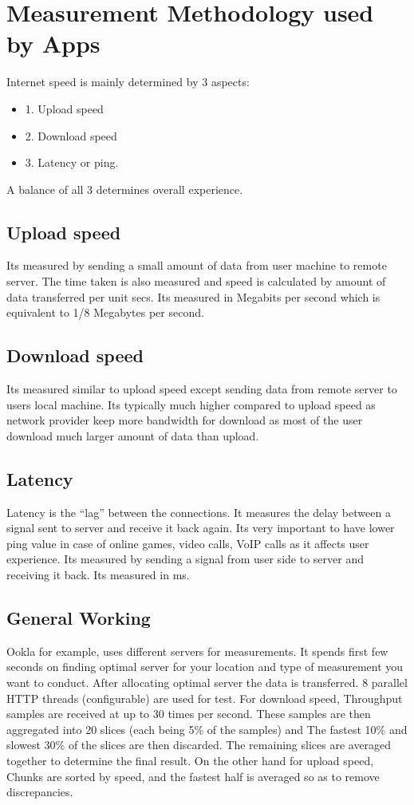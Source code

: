 \documentclass{article}
\begin{document}
\section{Measurement Methodology used by Apps}
Internet speed is mainly determined by  3 aspects:
\begin{itemize}
    \item 1. Upload speed 
\item 2. Download speed
\item 3. Latency or ping.
\end{itemize}


A balance of all 3 determines overall experience.
\subsection{Upload speed}
Its measured by sending a small amount of data from user machine to remote server. The time taken is also measured and speed is calculated by amount of data transferred per unit secs. Its measured in Megabits per second which is equivalent to 1/8 Megabytes per second.
\subsection{Download speed}
Its measured similar to upload speed except sending data from remote server to users local machine. Its typically much higher compared to upload speed as network provider keep more bandwidth for download as most of the user download much larger amount of data than upload.
\subsection{Latency}
Latency is the “lag” between the connections. It measures the delay between a signal sent to server and receive it back again. Its very important to have lower ping value in case of online games, video calls, VoIP calls as it affects user experience. Its measured by sending a signal from user side to server and receiving it back. Its measured in ms.
\subsection{General Working}
Ookla for example, uses different servers for measurements. It spends first few seconds on finding optimal server for your location and type of measurement you want to conduct. After allocating optimal server the data is transferred. 8 parallel HTTP threads (configurable) are used for test. For download speed, Throughput samples are received at up to 30 times per second. These samples are then aggregated into 20 slices (each being 5\% of the samples) and The fastest 10\% and slowest 30\% of the slices are then discarded. The remaining slices are averaged together to determine the final result. On the other hand for upload speed, Chunks are sorted by speed, and the fastest half is averaged so as to remove discrepancies.		
\end{document}

